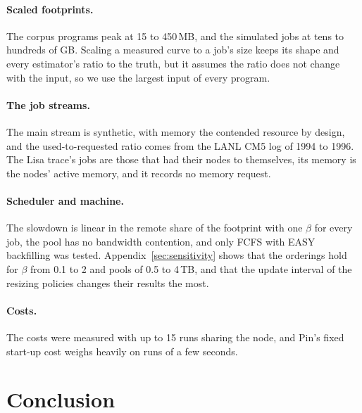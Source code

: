 \documentclass[11pt]{article}
\begin{document}
\paragraph{Scaled footprints.} The corpus programs peak at 15 to 450\,MB, and the simulated jobs at tens to hundreds of GB.
Scaling a measured curve to a job's size keeps its shape and every estimator's ratio to the truth, but it assumes the ratio
does not change with the input, so we use the largest input of every program.

\paragraph{The job streams.} The main stream is synthetic, with memory the contended resource by design, and the
used-to-requested ratio comes from the LANL CM5 log of 1994 to 1996. The Lisa trace's jobs are those that had their nodes to
themselves, its memory is the nodes' active memory, and it records no memory request.

\paragraph{Scheduler and machine.} The slowdown is linear in the remote share of the footprint with one $\beta$ for every job,
the pool has no bandwidth contention, and only FCFS with EASY backfilling was tested. Appendix~\ref{sec:sensitivity} shows that the orderings
hold for $\beta$ from 0.1 to 2 and pools of 0.5 to 4\,TB, and that the update interval of the resizing policies changes their
results the most.

\paragraph{Costs.} The costs were measured with up to 15 runs sharing the node, and Pin's fixed start-up cost weighs heavily on
runs of a few seconds.

\section{Conclusion}
\label{sec:conclusion}
\end{document}
